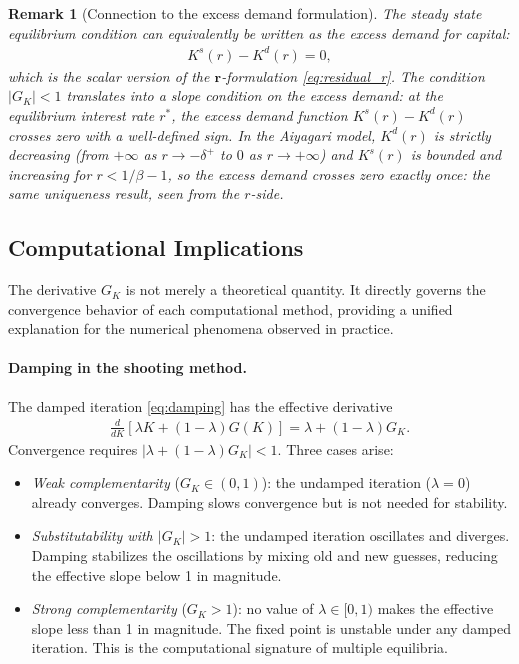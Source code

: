 \documentclass[12pt]{article}
\newtheorem{remark}{Remark}
\begin{document}
\begin{remark}[Connection to the excess demand formulation]
\label{rem:excess_demand}
The steady state equilibrium condition can equivalently be written as the excess demand for capital:
\begin{align}
    K^s(r) - K^d(r) = 0, \label{eq:excess_demand_ss}
\end{align}
which is the scalar version of the $\mathbf{r}$-formulation \eqref{eq:residual_r}. The condition $|G_K| < 1$ translates into a slope condition on the excess demand: at the equilibrium interest rate $r^*$, the excess demand function $K^s(r) - K^d(r)$ crosses zero with a well-defined sign. In the Aiyagari model, $K^d(r)$ is strictly decreasing (from $+\infty$ as $r \to -\delta^+$ to $0$ as $r \to +\infty$) and $K^s(r)$ is bounded and increasing for $r < 1/\beta - 1$, so the excess demand crosses zero exactly once: the same uniqueness result, seen from the $r$-side.
\end{remark}

\subsection{Computational Implications}
\label{ssec:comp_implications}

The derivative $G_K$ is not merely a theoretical quantity. It directly governs the convergence behavior of each computational method, providing a unified explanation for the numerical phenomena observed in practice.

\paragraph{Damping in the shooting method.} The damped iteration \eqref{eq:damping} has the effective derivative
\begin{align}
    \frac{d}{dK}\left[\lambda K + (1-\lambda) G(K)\right] = \lambda + (1-\lambda) G_K. \label{eq:effective_slope}
\end{align}
Convergence requires $|\lambda + (1-\lambda) G_K| < 1$. Three cases arise:
\begin{itemize}[nosep]
    \item \emph{Weak complementarity} ($G_K \in (0,1)$): the undamped iteration ($\lambda = 0$) already converges. Damping slows convergence but is not needed for stability.
    \item \emph{Substitutability with $|G_K| > 1$}: the undamped iteration oscillates and diverges. Damping stabilizes the oscillations by mixing old and new guesses, reducing the effective slope below 1 in magnitude.
    \item \emph{Strong complementarity} ($G_K > 1$): no value of $\lambda \in [0,1)$ makes the effective slope less than 1 in magnitude. The fixed point is unstable under any damped iteration. This is the computational signature of multiple equilibria.
\end{itemize}
\end{document}
